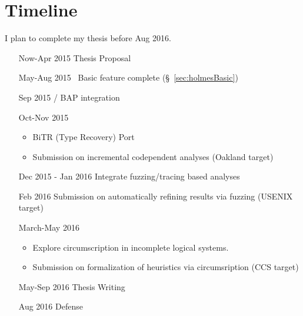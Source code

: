 \section{Timeline}
I plan to complete my thesis before Aug 2016.
\begin{enumerate}
\item[Now-Apr 2015] Thesis Proposal
\item[May-Aug 2015] \sysname\ Basic feature complete (\S~\ref{sec:holmesBasic})
\item[Sep 2015] \sysname / BAP integration
\item[Oct-Nov 2015]
  \begin{itemize}
  \item BiTR (Type Recovery) Port
  \item Submission on incremental codependent analyses (Oakland target)
  \end{itemize}
\item[Dec 2015 - Jan 2016] Integrate fuzzing/tracing based analyses
\item[Feb 2016] Submission on automatically refining results via fuzzing (USENIX target)
\item[March-May 2016]
  \begin{itemize}
  \item Explore circumscription in incomplete logical systems.
  \item Submission on formalization of heuristics via circumsription (CCS target)
  \end{itemize}
\item[May-Sep 2016] Thesis Writing
\item[Aug 2016] Defense
\end{enumerate}
